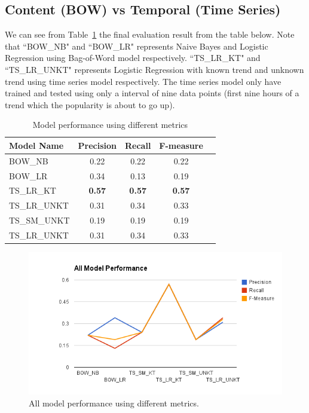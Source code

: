 \documentclass{article}
\begin{document}
\subsection{Content (BOW) vs Temporal (Time Series)}

We can see from Table~\ref{tab-result} the final evaluation result from the table below. Note that ``BOW\_NB" and ``BOW\_LR" represents Naive Bayes and Logistic Regression using Bag-of-Word model respectively. ``TS\_LR\_KT" and ``TS\_LR\_UNKT" represents Logistic Regression with known trend and unknown trend using time series model respectively. The time series model only have trained and tested using only a interval of nine data points (first nine hours of a trend which the popularity is about to go up).  

\begin{table}[t]
\caption{Model performance using different metrics}
\label{tab-result}
\vskip 0.15in
\begin{center}
\begin{small}
\begin{sc}
\begin{tabular}{lcccr}
\hline
\abovespace\belowspace
Model Name & Precision & Recall & F-measure \\
\hline
\abovespace
BOW\_NB   & 0.22 & 0.22 & 0.22 \\		
BOW\_LR & 0.34 & 0.13 & 0.19 \\		
TS\_LR\_KT    & \textbf{0.57} & \textbf{0.57} & \textbf{0.57} \\	
TS\_LR\_UNKT   & 0.31 & 0.34 & 0.33     \\
TS\_SM\_UNKT	& 0.19	& 0.19	& 0.19	\\
\belowspace
TS\_LR\_UNKT	& 0.31	& 0.34	& 0.33	\\
\hline
\end{tabular}
\end{sc}
\end{small}
\end{center}
\vskip -0.1in
\end{table}

\begin{figure}[ht]
\vskip 0.2in
\begin{center}
\centerline{\includegraphics[width=\columnwidth]{allPerformance}}
\caption{All model performance using different metrics.}
\label{all-performance}
\end{center}
\vskip -0.2in
\end{figure} 
\end{document}
